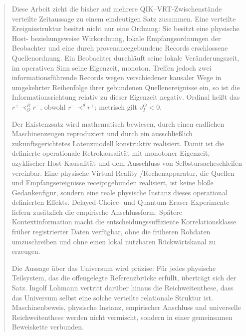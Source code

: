 \documentclass[11pt,a4paper]{article}
\theoremstyle{remark}
\newcommand{\recv}{\prec_{\!O}^{R}}
\newcommand{\sourceord}{\prec^{\theta}}
\begin{document}

\begin{abstract}
Diese Arbeit zieht die bisher auf mehrere QIK--VRT-Zwischenstände verteilte
Zeitaussage zu einem eindeutigen Satz zusammen. Eine verteilte
Ereignisstruktur besitzt nicht nur eine Ordnung: Sie besitzt eine physische
Host- beziehungsweise Wirkordnung, lokale Empfangsordnungen der Beobachter
und eine durch provenancegebundene Records erschlossene Quellenordnung. Ein
Beobachter durchläuft seine lokale Veränderungszeit, im operativen Sinn seine
Eigenzeit, monoton. Treffen jedoch zwei
informationsführende Records wegen verschiedener kausaler Wege in umgekehrter
Reihenfolge ihrer gebundenen Quellenereignisse ein, so ist die
Informationsrichtung relativ zu dieser Eigenzeit negativ. Ordinal heißt das
\(r^{+}\recv r^{-}\), obwohl \(r^{-}\sourceord r^{+}\); metrisch gilt
\(v_I^O<0\).

Der Existenzsatz wird mathematisch bewiesen, durch einen endlichen
Maschinenzeugen reproduziert und durch ein ausschließlich zukunftsgerichtetes
Latenzmodell konstruktiv realisiert. Damit ist die definierte operationale
Retrokausalität mit monotoner Eigenzeit, azyklischer Host-Kausalität und dem
Ausschluss von Selbstursacheschleifen vereinbar. Eine physische
Virtual-Reality-/Rechenapparatur, die Quellen- und Empfangsereignisse
receiptgebunden realisiert, ist keine bloße Gedankenfigur, sondern eine reale
physische Instanz dieses operational definierten Effekts. Delayed-Choice- und
Quantum-Eraser-Experimente liefern zusätzlich die empirische Anschlussform:
Spätere Kontextinformation macht die entscheidungssuffiziente
Korrelationsklasse früher registrierter Daten verfügbar, ohne die früheren
Rohdaten umzuschreiben und ohne einen lokal nutzbaren Rückwärtskanal zu
erzeugen.

Die Aussage über das Universum wird präzise: Für jedes physische Teilsystem,
das die offengelegte Referenzbrücke erfüllt, überträgt sich der Satz. Ingolf
Lohmann vertritt darüber hinaus die Reichweitenthese, dass das Universum
selbst eine solche verteilte relationale Struktur ist. Maschinenbeweis,
physische Instanz, empirischer Anschluss und universelle Reichweitenthese
werden nicht vermischt, sondern in einer gemeinsamen Beweiskette verbunden.
\end{abstract}
\end{document}
